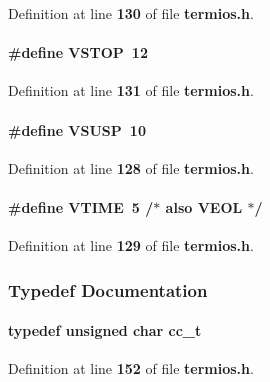 Definition at line {\bf 130} of file {\bf termios.\+h}.

\paragraph[{V\+S\+T\+OP}]{\setlength{\rightskip}{0pt plus 5cm}\#define V\+S\+T\+OP~12}\label{termios_8h_af3c4df8e33e15100b0a9e3ae6aa02d92}


Definition at line {\bf 131} of file {\bf termios.\+h}.

\paragraph[{V\+S\+U\+SP}]{\setlength{\rightskip}{0pt plus 5cm}\#define V\+S\+U\+SP~10}\label{termios_8h_a348dc585f00cea776b320e7527e2f656}


Definition at line {\bf 128} of file {\bf termios.\+h}.

\paragraph[{V\+T\+I\+ME}]{\setlength{\rightskip}{0pt plus 5cm}\#define V\+T\+I\+ME~5 /$\ast$ also {\bf V\+E\+OL} $\ast$/}\label{termios_8h_a674c937c98eb91a74265cd9cb55565a3}


Definition at line {\bf 129} of file {\bf termios.\+h}.



\subsubsection{Typedef Documentation}
\paragraph[{cc\+\_\+t}]{\setlength{\rightskip}{0pt plus 5cm}typedef unsigned char {\bf cc\+\_\+t}}\label{termios_8h_a02a4a51b25871e505aad0dcae945a0dc}


Definition at line {\bf 152} of file {\bf termios.\+h}.

